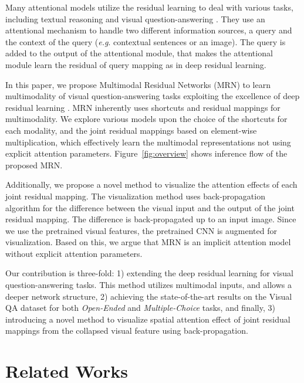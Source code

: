 \documentclass{article}
\newcommand{\onedot}[0]{.\xspace}
\newcommand{\eg}[0]{\emph{e.g}\onedot}
\begin{document}
Many attentional models utilize the residual learning to deal with various tasks, including textual reasoning \cite{Sukhbaatar2015,Rocktaschel2015} and visual question-answering \cite{Yang2015}. They use an attentional mechanism to handle two different information sources, a query and the context of the query (\eg contextual sentences or an image). The query is added to the output of the attentional module, that makes the attentional module learn the residual of query mapping as in deep residual learning. 


In this paper, we propose Multimodal Residual Networks (MRN) to learn multimodality of visual question-answering tasks exploiting the excellence of deep residual learning \cite{He2015}. MRN inherently uses shortcuts and residual mappings for multimodality. We explore various models upon the choice of the shortcuts for each modality, and the joint residual mappings based on element-wise multiplication, which effectively learn the multimodal representations not using explicit attention parameters. Figure~\ref{fig:overview} shows inference flow of the proposed MRN.

Additionally, we propose a novel method to visualize the attention effects of each joint residual mapping. The visualization method uses back-propagation algorithm \cite{rumelhart1986} for the difference between the visual input and the output of the joint residual mapping. The difference is back-propagated up to an input image. Since we use the pretrained visual features, the pretrained CNN is augmented for visualization. Based on this, we argue that MRN is an implicit attention model without explicit attention parameters.

Our contribution is three-fold: 1) extending the deep residual learning for visual question-answering tasks. This method utilizes multimodal inputs, and allows a deeper network structure, 2) achieving the state-of-the-art results on the Visual QA dataset for both \textit{Open-Ended} and \textit{Multiple-Choice} tasks, and finally, 3) introducing a novel method to visualize spatial attention effect of joint residual mappings from the collapsed visual feature using back-propagation.

\section{Related Works}
\end{document}
